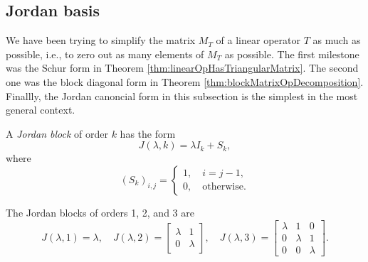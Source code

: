 \subsection{Jordan basis}
\label{sec:revi-jord-canon}

\begin{rem}
  We have been trying to simplify the matrix $M_T$ of a linear
  operator $T$
  as much as possible, i.e., 
  to zero out as many elements of $M_T$ as possible.
  The first milestone was the Schur form
  in Theorem \ref{thm:linearOpHasTriangularMatrix}.
  The second one was the block diagonal form
  in Theorem \ref{thm:blockMatrixOpDecomposition}.
  Finallly, the Jordan canoncial form in this subsection
  is the simplest in the most general context.
\end{rem}

\begin{defn}
  A \emph{Jordan block} of order $k$ has the form
  \begin{equation}
    \label{eq:JordanBlock}
    J(\lambda, k) = \lambda I_k+S_k,
  \end{equation}
  where
  \begin{equation*}
    (S_k)_{i,j}= \begin{cases}
      1, \quad i=j-1, \\
      0, \quad \text{otherwise.}
    \end{cases}
  \end{equation*}
\end{defn}

\begin{exm}
  The Jordan blocks of orders 1, 2, and 3 are
  \begin{equation*}
    J(\lambda, 1) = \lambda, \quad
    J(\lambda,2) = \begin{bmatrix}
      \lambda & 1 \\
      0 & \lambda
    \end{bmatrix}, \quad
    J(\lambda, 3) = \begin{bmatrix}
      \lambda & 1 & 0 \\
      0 & \lambda & 1 \\
      0 & 0 & \lambda
    \end{bmatrix}.
  \end{equation*}
\end{exm}

